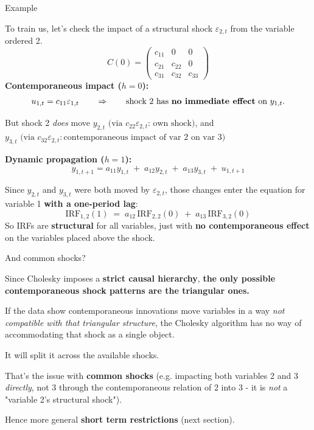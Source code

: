 \documentclass{beamer}
\begin{document}
\begin{frame}{Example}
\small

To train us, let's check the impact of a structural shock $\varepsilon_{2,t}$ from the variable ordered 2. 
\[
C(0)=
\begin{pmatrix}
c_{11} & 0      & 0 \\
c_{21} & c_{22} & 0 \\
c_{31} & c_{32} & c_{33}
\end{pmatrix}
\]
\textbf{Contemporaneous impact ($h = 0$):}
\pause
\[
u_{1,t} = c_{11}\varepsilon_{1,t}
\qquad\Rightarrow\qquad
\text{shock 2 has \textbf{no immediate effect} on $y_{1,t}$.}
\]

But shock 2 \emph{does} move $y_{2,t}\text{ (via $c_{22}\varepsilon_{2,t}$: own shock)}$, and $y_{3,t}\text{ (via $c_{32}\varepsilon_{2,t}: \text{contemporaneous impact of var 2 on var 3}$)}$


\medskip

\textbf{Dynamic propagation ($h = 1$):}
\pause
\[
y_{1,t+1}
= a_{11}y_{1,t} \;+\; a_{12}y_{2,t} \;+\; a_{13}y_{3,t} \;+\; u_{1,t+1}
\]

Since $y_{2,t}$ and $y_{3,t}$ were both moved by $\varepsilon_{2,t}$, those changes enter the equation for variable 1 \textbf{with a one-period lag}:
\[
\text{IRF}_{1,2}(1)
\;=\;
a_{12}\,\text{IRF}_{2,2}(0)
\;+\;
a_{13}\,\text{IRF}_{3,2}(0)
\]
So IRFs are \textbf{structural} for all variables, just with \textbf{no contemporaneous effect} on the variables placed above the shock.

\end{frame}

\begin{frame}{And common shocks?}

Since Cholesky imposes a \textbf{strict causal hierarchy}, \textbf{the only possible contemporaneous shock patterns are the triangular ones.}

\medskip

If the data show contemporaneous innovations move variables in a way \textit{not compatible with that triangular structure}, the Cholesky algorithm has no way of accommodating that shock as a single object.

\medskip

It will split it across the available shocks.

\medskip

That's the issue with \textbf{common shocks} (e.g. impacting both variables 2 and 3 \textit{directly}, not 3 through the contemporaneous relation of 2 into 3 - it is \textit{not} a "variable 2's structural shock").

\medskip

Hence more general\textbf{ short term restrictions }(next section). 

 
    
\end{frame}
\end{document}
